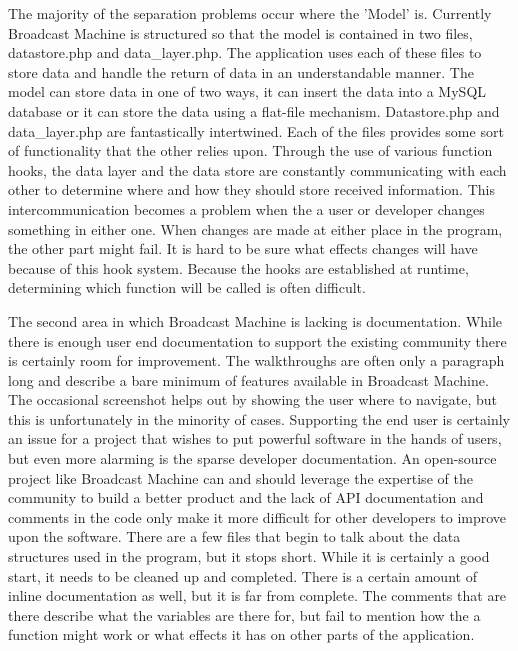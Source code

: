 \documentclass[a4paper,12pt]{report}
\begin{document}
The majority of the separation problems occur where the 'Model' is. Currently Broadcast Machine is structured so that the model is contained in two files, datastore.php and data\_layer.php. The application uses each of these files to store data and handle the return of data in an understandable manner. The model can store data in one of two ways, it can insert the data into a MySQL database or it can store the data using a flat-file mechanism. Datastore.php and data\_layer.php are fantastically intertwined. Each of the files provides some sort of functionality that the other relies upon. Through the use of various function hooks, the data layer and the data store are constantly communicating with each other to determine where and how they should store received information. This intercommunication becomes a problem when the a user or developer changes something in either one. When changes are made at either place in the program, the other part might fail. It is hard to be sure what effects changes will have because of this hook system. Because the hooks are established at runtime, determining which function will be called is often difficult.
	
	The second area in which Broadcast Machine is lacking is documentation. 
While there is enough user end documentation to support the existing community there is certainly room for improvement. 
The walkthroughs are often only a paragraph long and describe a bare minimum of features available in Broadcast Machine. 
The occasional screenshot helps out by showing the user where to navigate, but this is unfortunately in the minority of cases. 
Supporting the end user is certainly an issue for a project that wishes to put powerful software in the hands of users, but even more alarming is the sparse developer documentation. 
An open-source project like Broadcast Machine can and should leverage the expertise of the community to build a better product and the lack of API documentation and comments in the code only make it more difficult for other developers to improve upon the software. 
There are a few files that begin to talk about the data structures used in the program, but it stops short. 
While it is certainly a good start, it needs to be cleaned up and completed. There is a certain amount of inline documentation as well, but it is far from complete. 
The comments that are there describe what the variables are there for, but fail to mention how the a function might work or what effects it has on other parts of the application.
	
\end{document}
